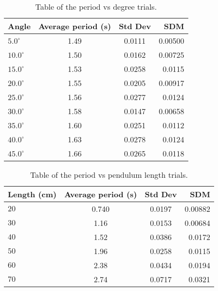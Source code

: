 \documentclass{article}
\begin{document}
\begin{table}[h!]
  \begin{center}
    \caption{Table of the period vs degree trials.}
    \label{tab:table1}
    \begin{tabular}{l|c|c|r} %
      \textbf{Angle} & \textbf{Average period (s)} & \textbf{Std Dev} & \textbf{SDM}\\
      \hline
      $5.0^{\circ}$ & 1.49 & 0.0111 & 0.00500\\
      $10.0^{\circ}$ & 1.50 & 0.0162 & 0.00725\\
      $15.0^{\circ}$ & 1.53 & 0.0258 & 0.0115\\
      $20.0^{\circ}$ & 1.55 & 0.0205 & 0.00917\\
      $25.0^{\circ}$ & 1.56 & 0.0277 & 0.0124\\
      $30.0^{\circ}$ & 1.58 & 0.0147 & 0.00658\\
      $35.0^{\circ}$ & 1.60 & 0.0251 & 0.0112\\
      $40.0^{\circ}$ &1.63 & 0.0278 & 0.0124\\
      $45.0^{\circ}$ & 1.66 & 0.0265 & 0.0118\\
    \end{tabular}
  \end{center}
\end{table}

\begin{table}[h!]
  \begin{center}
    \caption{Table of the period vs pendulum length trials.}
    \label{tab:table1}
    \begin{tabular}{l|c|c|r} %
      \textbf{Length (cm)} & \textbf{Average period (s)} & \textbf{Std Dev} & \textbf{SDM}\\
      \hline
      $20$ & 0.740 & 0.0197 & 0.00882\\
      $30$ & 1.16 & 0.0153 & 0.00684\\
      $40$ & 1.52 & 0.0386 & 0.0172\\
      $50$ & 1.96 & 0.0258 & 0.0115\\
      $60$ & 2.38 & 0.0434 & 0.0194\\
      $70$ & 2.74 & 0.0717 & 0.0321\\
    \end{tabular}
  \end{center}
\end{table}
\end{document}
